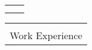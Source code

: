 \documentclass[10pt]{article}
\makeatletter
\newcommand{\bigname}[3]{{\fontsize{#2}{#3}\selectfont \textit{#1}}}
\newcommand{\phyaddress}[3]{{\fontsize{#2}{#3}\selectfont \textit{#1}}}
\newcommand{\ncheader}[9]{
  \newlength{\oldtabcolsep}
  \setlength{\oldtabcolsep}{\tabcolsep}
  \setlength{\tabcolsep}{2.0em}
  \begin{tabularx}{\textwidth}{@{}X p{#3}@{}}
    \makebox[\linewidth][s]{#1} & \multirow{2}{#3}[#4]{\centering #2} \\
    \makebox[\linewidth][s]{%
      \fontsize{#8}{#9}\selectfont \textit{\mbox{#5} \mbox{#6} \mbox{#7}}%
    } &
  \end{tabularx}
  \setlength{\tabcolsep}{\oldtabcolsep}
  \let\oldtabcolsep\undefined
}
\newcommand{\secheader}[1]{
  \begin{tabularx}{\textwidth}{@{}X}
    \midrule[0.095em] \\ \addlinespace[-1.2em]
    #1 \\
    \bottomrule[0.02em]
  \end{tabularx}
}
\makeatother
\begin{document}
\ncheader{\bigname{Ram Raghunathan}{36}{43}}
         {\phyaddress{123 Main Street, Apt 1A Somecity, SS 01234}
           {12}{13}}
         {6cm}
         {2mm}
         {username@domain}
         {(555)123-4567}
         {U.S.A. Citizen}
         {11}
         {13}

\secheader{Work Experience}
\end{document}
